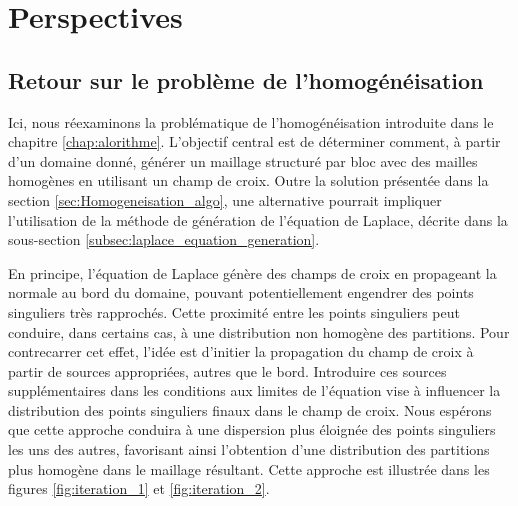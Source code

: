 \section{Perspectives}

\subsection*{Retour sur le problème de l'homogénéisation}

Ici, nous réexaminons la problématique de l'homogénéisation introduite dans le chapitre \ref{chap:alorithme}. L'objectif central est de déterminer comment, à partir d'un domaine donné, générer un maillage structuré par bloc avec des mailles homogènes en utilisant un champ de croix. Outre la solution présentée dans la section \ref{sec:Homogeneisation_algo}, une alternative pourrait impliquer l'utilisation de la méthode de génération de l'équation de Laplace, décrite dans la sous-section \ref{subsec:laplace_equation_generation}.

En principe, l'équation de Laplace génère des champs de croix en propageant la normale au bord du domaine, pouvant potentiellement engendrer des points singuliers très rapprochés. Cette proximité entre les points singuliers peut conduire, dans certains cas, à une distribution non homogène des partitions. Pour contrecarrer cet effet, l'idée est d'initier la propagation du champ de croix à partir de sources appropriées, autres que le bord. Introduire ces sources supplémentaires dans les conditions aux limites de l'équation vise à influencer la distribution des points singuliers finaux dans le champ de croix. Nous espérons que cette approche conduira à une dispersion plus éloignée des points singuliers les uns des autres, favorisant ainsi l'obtention d'une distribution des partitions plus homogène dans le maillage résultant. Cette approche est illustrée dans les figures \ref{fig:iteration_1} et \ref{fig:iteration_2}.

